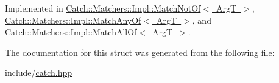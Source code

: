 Implemented in \mbox{\hyperlink{structCatch_1_1Matchers_1_1Impl_1_1MatchNotOf_a181d693c0258e582d80dc6117a1f2b66}{Catch\+::\+Matchers\+::\+Impl\+::\+Match\+Not\+Of$<$ Arg\+T $>$}}, \mbox{\hyperlink{structCatch_1_1Matchers_1_1Impl_1_1MatchAnyOf_a8a3e8338f979e56277dcf553efb78dc0}{Catch\+::\+Matchers\+::\+Impl\+::\+Match\+Any\+Of$<$ Arg\+T $>$}}, and \mbox{\hyperlink{structCatch_1_1Matchers_1_1Impl_1_1MatchAllOf_acfb377bda2c58ae62e6df9c3a8a89f8f}{Catch\+::\+Matchers\+::\+Impl\+::\+Match\+All\+Of$<$ Arg\+T $>$}}.



The documentation for this struct was generated from the following file\+:\begin{DoxyCompactItemize}
\item 
include/\mbox{\hyperlink{catch_8hpp}{catch.\+hpp}}\end{DoxyCompactItemize}
